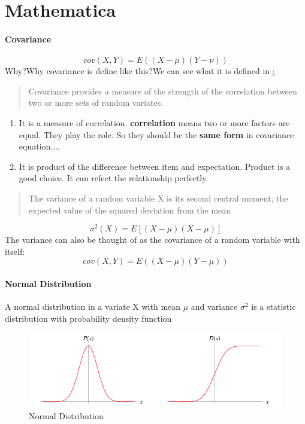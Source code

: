 \documentclass[12pt]{article}
\begin{document}
\section {Mathematica}
\paragraph{Covariance}
\begin{equation}
cov(X,Y) = E((X-\mu)(Y-\nu))
\end{equation}
Why?Why covariance is define like this?We can see what it is defined in \href{http://mathworld.wolfram.com/Covariance.html{mathworld}}:
\begin{quote}
Covariance provides a measure of the strength of the correlation between two or more sets of random variates.
\end{quote}

\begin{enumerate}
	\item It is a measure of correlation. \textbf{correlation} means two or more factors are equal. They play the role. So they should be the \textbf{same form} in covariance equation.... 
	\item It is product of the difference between item and expectation. Product is a good choice. It can refect the relationship perfectly. 
\end{enumerate}

\begin{quote}
The variance of a random variable X is its second central moment, the expected value of the squared deviation from the mean 
\end{quote}
\begin{equation}
	\sigma^2(X) = E[(X-\mu)(X-\mu)]
\end{equation}
The variance can also be thought of as the covariance of a random variable with itself:
\begin{equation}
	cov(X,Y) = E((X-\mu)(Y-\mu))
\end{equation}

\paragraph{Normal Distribution}
A normal distribution in a variate X with mean $\mu$ and variance $\sigma^2$ is a statistic distribution with probability density function
\begin{figure}[ht!]
\centering
\includegraphics{./img/NormalDistribution.png}
\caption{Normal Distribution}
\end{figure}
\end{document}
